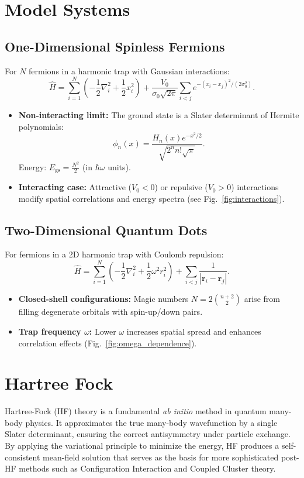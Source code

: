 \section{Model Systems}
\subsection{One-Dimensional Spinless Fermions}
For \(N\) fermions in a harmonic trap with Gaussian interactions:  
\[
\hat{H} = \sum_{i=1}^N \left(-\frac{1}{2} \nabla_i^2 + \frac{1}{2} x_i^2 \right) + \frac{V_0}{\sigma_0 \sqrt{2\pi}} \sum_{i<j} e^{-(x_i - x_j)^2/(2\sigma_0^2)}.
\]
\begin{itemize}
    \item \textbf{Non-interacting limit:} The ground state is a Slater determinant of Hermite polynomials:  
    \[
    \phi_n(x) = \frac{H_n(x)e^{-x^2/2}}{\sqrt{2^n n! \sqrt{\pi}}}.
    \]
    Energy: \(E_{\text{gs}} = \frac{N^2}{2}\) (in \(\hbar\omega\) units).
    \item \textbf{Interacting case:} Attractive (\(V_0 < 0\)) or repulsive (\(V_0 > 0\)) interactions modify spatial correlations and energy spectra (see Fig.~\ref{fig:interactions}).
\end{itemize}

\subsection{Two-Dimensional Quantum Dots}
For fermions in a 2D harmonic trap with Coulomb repulsion:  
\[
\hat{H} = \sum_{i=1}^N \left(-\frac{1}{2} \nabla_i^2 + \frac{1}{2} \omega^2 r_i^2 \right) + \sum_{i<j} \frac{1}{|\bm{r}_i - \bm{r}_j|}.
\]
\begin{itemize}
    \item \textbf{Closed-shell configurations:} Magic numbers \(N = 2\binom{n+2}{2}\) arise from filling degenerate orbitals with spin-up/down pairs.
    \item \textbf{Trap frequency \(\omega\):} Lower \(\omega\) increases spatial spread and enhances correlation effects (Fig.~\ref{fig:omega_dependence}).
\end{itemize}



\section{Hartree Fock}
Hartree-Fock (HF) theory is a fundamental \emph{ab initio} method in quantum many-body physics. It approximates the true many-body wavefunction by a single Slater determinant, ensuring the correct antisymmetry under particle exchange. By applying the variational principle to minimize the energy, HF produces a self-consistent mean-field solution that serves as the basis for more sophisticated post-HF methods such as Configuration Interaction and Coupled Cluster theory.

